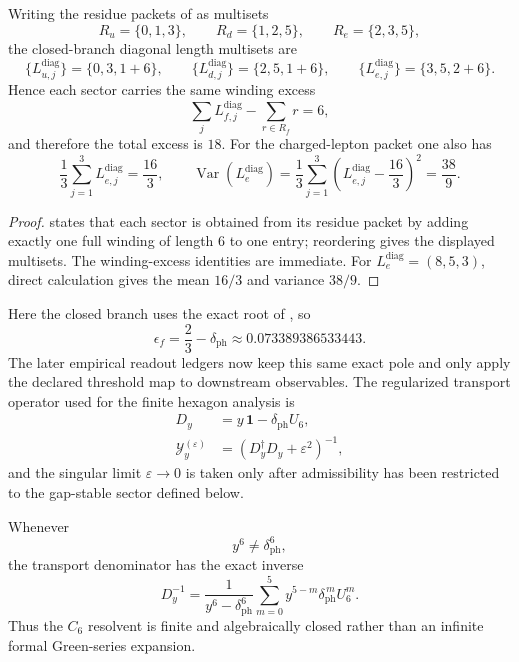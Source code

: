 \begin{corollary}
\label{cor:single-winding-transport}
Writing the residue packets of  as multisets
\[
R_u=\{0,1,3\},
\qquad
R_d=\{1,2,5\},
\qquad
R_e=\{2,3,5\},
\]
the closed-branch diagonal length multisets are
\[
\{L_{u,j}^{\mathrm{diag}}\}=\{0,3,1+6\},
\qquad
\{L_{d,j}^{\mathrm{diag}}\}=\{2,5,1+6\},
\qquad
\{L_{e,j}^{\mathrm{diag}}\}=\{3,5,2+6\}.
\]
Hence each sector carries the same winding excess
\[
\sum_j L_{f,j}^{\mathrm{diag}}-\sum_{r\in R_f}r=6,
\]
and therefore the total excess is $18$. For the charged-lepton packet one also has
\[
\frac{1}{3}\sum_{j=1}^3 L_{e,j}^{\mathrm{diag}}=\frac{16}{3},
\qquad
\operatorname{Var}(L_e^{\mathrm{diag}})
=
\frac{1}{3}\sum_{j=1}^3\left(L_{e,j}^{\mathrm{diag}}-\frac{16}{3}\right)^2
=
\frac{38}{9}.
\]
\end{corollary}

\begin{proof}
 states that each sector is obtained from its residue packet by
adding exactly one full winding of length $6$ to one entry; reordering gives the displayed
multisets. The winding-excess identities are immediate. For $L_e^{\mathrm{diag}}=(8,5,3)$, direct
calculation gives the mean $16/3$ and variance $38/9$.
\end{proof}

Here the closed branch uses the exact root of , so
\[
\epsilon_f
=
\frac23-\delta_{\mathrm{ph}}
\approx \num{0.073389386533443}.
\]
The later empirical readout ledgers now keep this same exact pole and only apply the declared threshold
map to downstream observables. The regularized transport operator used for the finite
hexagon analysis is
\begin{equation}
\label{eq:yukawa-kernel}
\begin{aligned}
D_y&=y\,\mathbf 1-\delta_{\mathrm{ph}}U_6,\\
\mathcal Y_y^{(\varepsilon)}&=(D_y^\dagger D_y+\varepsilon^2)^{-1},
\end{aligned}
\end{equation}
and the singular limit $\varepsilon\to0$ is taken only after admissibility has been restricted to the gap-stable sector defined below.

\begin{proposition}
\label{prop:finite-hexagonal-resolvent}
Whenever
\[
y^6\neq \delta_{\mathrm{ph}}^6,
\]
the transport denominator has the exact inverse
\begin{equation}
\label{eq:finite-hexagonal-resolvent}
D_y^{-1}
=
\frac{1}{y^6-\delta_{\mathrm{ph}}^6}
\sum_{m=0}^{5}y^{5-m}\delta_{\mathrm{ph}}^{\,m}U_6^m.
\end{equation}
Thus the $C_6$ resolvent is finite and algebraically closed rather than an infinite formal Green-series expansion.
\end{proposition}

